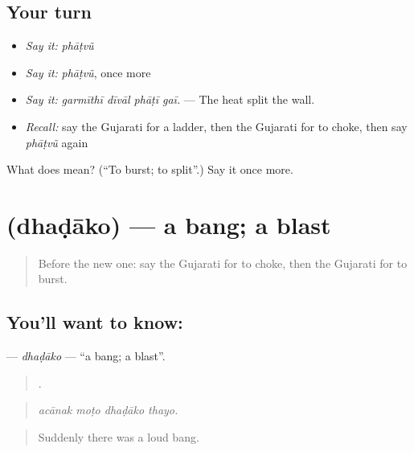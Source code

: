 \subsection*{Your turn}
\begin{itemize}
\raggedright
  \item \emph{Say it:} \emph{phāṭvũ}
  \item \emph{Say it:} \emph{phāṭvũ}, once more
  \item \emph{Say it:} \emph{garmīthī dīvāl phāṭī gaī.} — The heat split the wall.
  \item \emph{Recall:} say the Gujarati for a ladder, then the Gujarati for to choke, then say \emph{phāṭvũ} again
\end{itemize}

\begin{tcolorbox}[breakable,colback=teal!4,colframe=teal!35!black,title={Before you move on}]
What does  mean? (\textquotedblleft{}To burst; to split\textquotedblright{}.) Say it once more.
\end{tcolorbox}
\section[\texorpdfstring{\gu{ધડાકો} (dhaḍāko)}{ધડાકો (dhaḍāko)}]{ (dhaḍāko) — a bang; a blast}

\label{lesson:GU-C301-dhadako}



\begin{quote}
Before the new one: say the Gujarati for to choke, then the Gujarati for to burst.
\end{quote}

\subsection*{You'll want to know: }
\textbf{} — \emph{dhaḍāko} — \textquotedblleft{}a bang; a blast\textquotedblright{}.

\begin{quote}
   .
\end{quote}

\begin{quote}
\emph{acānak moṭo dhaḍāko thayo.}
\end{quote}

\begin{quote}
Suddenly there was a loud bang.
\end{quote}

